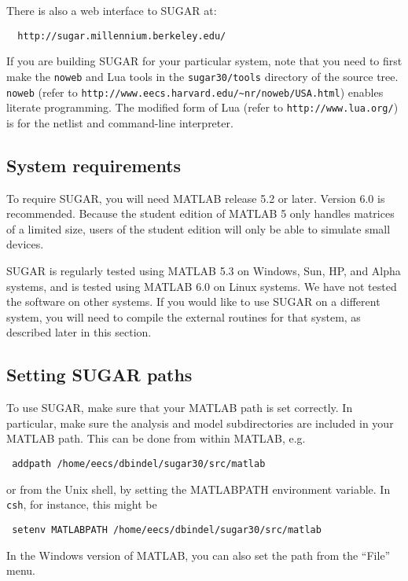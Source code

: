 There is also a web interface to SUGAR at:
\begin{verbatim}
  http://sugar.millennium.berkeley.edu/
\end{verbatim}

If you are building SUGAR for your particular system, note that you need to
first make the {\tt noweb} and Lua tools in the {\tt sugar30/tools} directory
of the source tree. {\tt noweb} (refer to {\tt http://www.eecs.harvard.edu/\~{}nr/noweb/USA.html}) enables literate programming. The modified form of Lua
(refer to {\tt http://www.lua.org/}) is for the netlist and 
command-line interpreter.


\subsection{System requirements}

To require SUGAR, you will need MATLAB release 5.2 or later. Version 6.0 is
recommended. Because the student edition of MATLAB 5 only handles matrices
of a limited size, users of the student edition will only be able
to simulate small devices.

SUGAR is regularly tested using MATLAB 5.3 on Windows, Sun, HP,
and Alpha systems, and is tested using MATLAB 6.0 on Linux systems.
We have not tested the software on other systems.
If you would like to use SUGAR on a different system,
you will need to compile the external routines for that system,
as described later in this section.

\subsection{Setting SUGAR paths}

To use SUGAR, make sure that your MATLAB path is set correctly.
In particular, make sure the analysis and model subdirectories are
included in your MATLAB path.  This can be done from within MATLAB, e.g.
\begin{verbatim}
 addpath /home/eecs/dbindel/sugar30/src/matlab
\end{verbatim}
or from the Unix shell, by setting the MATLABPATH environment variable.
In \texttt{csh}, for instance, this might be 
\begin{verbatim}
 setenv MATLABPATH /home/eecs/dbindel/sugar30/src/matlab
\end{verbatim}
In the Windows version of MATLAB, you can also set the path from 
the ``File'' menu.


